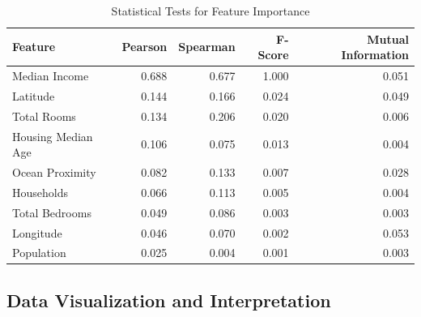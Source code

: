 \documentclass[a4paper, 11pt]{article}
\begin{document}
\begin{table}[h!]
    \centering
    \caption{Statistical Tests for Feature Importance}
    \begin{tabular}{lrrrr}
        \toprule
        \textbf{Feature} & \textbf{Pearson} & \textbf{Spearman} & \textbf{F-Score} & \textbf{Mutual Information} \\
        \midrule
        Median Income & 0.688 & 0.677 & 1.000 & 0.051 \\
        Latitude & 0.144 & 0.166 & 0.024 & 0.049 \\
        Total Rooms & 0.134 & 0.206 & 0.020 & 0.006 \\
        Housing Median Age & 0.106 & 0.075 & 0.013 & 0.004 \\
        Ocean Proximity & 0.082 & 0.133 & 0.007 & 0.028 \\
        Households & 0.066 & 0.113 & 0.005 & 0.004 \\
        Total Bedrooms & 0.049 & 0.086 & 0.003 & 0.003 \\
        Longitude & 0.046 & 0.070 & 0.002 & 0.053 \\
        Population & 0.025 & 0.004 & 0.001 & 0.003 \\
        \bottomrule
    \end{tabular}
\end{table}

\subsection{Data Visualization and Interpretation}
\end{document}
